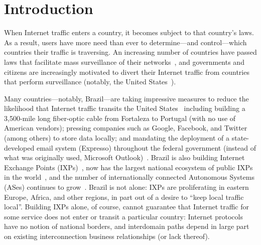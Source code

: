 \section{Introduction}
\label{intro}

When Internet traffic enters a country, it becomes subject to that
country's laws.  As a result, users have more need than ever to
determine---and control---which countries their traffic is traversing.
An increasing number of countries have passed laws that facilitate mass
surveillance of their networks~\cite{france_surveillance,
  netherlands_surveillance, kazak_surveillance, uk_bill}, and governments
and citizens are increasingly motivated to divert their Internet traffic
from countries that perform surveillance (notably, the United
States~\cite{russia_secure_internet,
  routing_errors, dte}).

Many countries---notably, Brazil---are taking impressive measures to reduce
the likelihood that Internet traffic transits the United
States~\cite{brazil_history, brazil_break_from_US, brazil_conference,
  brazil_conference2, brazil_human_rights} including building a 3,500-mile
 long fiber-optic cable from Fortaleza to Portugal (with no use of
American vendors); pressing companies such as Google, Facebook, and
Twitter (among others) to store data locally; and mandating the deployment of a state-developed email system (Expresso) throughout the federal government (instead of what was originally used, Microsoft Outlook)~\cite{brazil_cable, brazil_us_companies}.  Brazil is also
building Internet Exchange Points (IXPs)~\cite{brazil_IXP1}, now has the
largest national ecosystem of public IXPs in
the world~\cite{brazil_ixp_ecosystem}, and the number of internationally
connected Autonomous Systems (ASes) continues to
grow~\cite{brazil_international_ases}. Brazil is not alone: IXPs are
proliferating in eastern Europe, Africa, and other regions, in part out
of a desire to ``keep local traffic local''. Building IXPs alone, of
course, cannot guarantee that Internet traffic for some service does not
enter or transit a particular country: Internet protocols have no notion
of national borders, and interdomain paths depend in large part on
existing interconnection business relationships (or lack thereof). 

